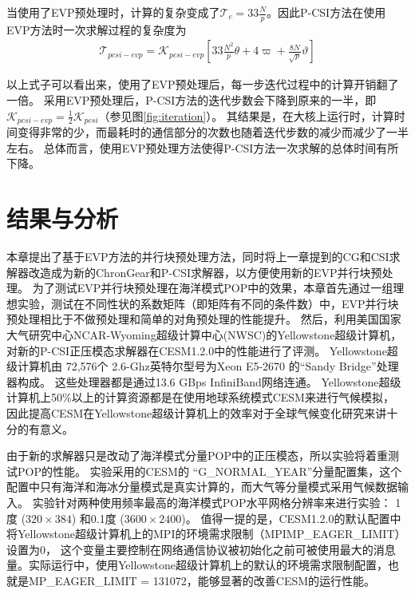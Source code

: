 当使用了EVP预处理时，计算的复杂变成了$\mathcal{T}_c = 33\frac{N}{p}$。因此P-CSI方法在使用EVP方法时一次求解过程的复杂度为
\begin{eqnarray}
\label{t_pcsiEvp}
\mathcal{T}_{pcsi-evp}=\mathcal{K}_{pcsi-evp}[33\frac{N^2}{p}\theta+ 4\varpi + \frac{8N}{ \sqrt{p}}\vartheta]
\end{eqnarray}

以上式子可以看出来，使用了EVP预处理后，每一步迭代过程中的计算开销翻了一倍。
采用EVP预处理后，P-CSI方法的迭代步数会下降到原来的一半，即$\mathcal{K}_{pcsi-evp} = \frac{1}{2}\mathcal{K}_{pcsi}$（参见图\ref{fig:iteration}）。
其结果是，在大核上运行时，计算时间变得非常的少，而最耗时的通信部分的次数也随着迭代步数的减少而减少了一半左右。
总体而言，使用EVP预处理方法使得P-CSI方法一次求解的总体时间有所下降。 


\section{结果与分析}
\label{precond:exp}


本章提出了基于EVP方法的并行块预处理方法，同时将上一章提到的CG和CSI求解器改造成为新的ChronGear和P-CSI求解器，以方便使用新的EVP并行块预处理。
为了测试EVP并行块预处理在海洋模式POP中的效果，本章首先通过一组理想实验，测试在不同性状的系数矩阵（即矩阵有不同的条件数）中，EVP并行块预处理相比于不做预处理和简单的对角预处理的性能提升。
然后，利用美国国家大气研究中心NCAR-Wyoming超级计算中心(NWSC)\cite{loft:2015}的Yellowstone超级计算机，对新的P-CSI正压模态求解器在CESM1.2.0中的性能进行了评测。 
Yellowstone超级计算机由 72,576个
2.6-Ghz英特尔型号为Xeon E5-2670 的“Sandy Bridge”处理器构成。 
这些处理器都是通过13.6 GBps InfiniBand网络连通。   
Yellowstone超级计算机上50\%以上的计算资源都是在使用地球系统模式CESM来进行气候模拟， 
因此提高CESM在Yellowstone超级计算机上的效率对于全球气候变化研究来讲十分的有意义\cite{wf2014}。 


由于新的求解器只是改动了海洋模式分量POP中的正压模态，所以实验将着重测试POP的性能。 
实验采用的CESM的
“G\_NORMAL\_YEAR”分量配置集，这个配置中只有海洋和海冰分量模式是真实计算的，而大气等分量模式采用气候数据输入。
实验针对两种使用频率最高的海洋模式POP水平网格分辨率来进行实验：
1度 ($320\times 384$) 和0.1度 ($3600\times 2400$)。
值得一提的是，CESM1.2.0的默认配置中将Yellowstone超级计算机上的MPI的环境需求限制（MPIMP\_EAGER\_LIMIT）设置为0， 这个变量主要控制在网络通信协议被初始化之前可被使用最大的消息量。实际运行中，使用Yellowstone超级计算机上的默认的环境需求限制配置，也就是MP\_EAGER\_LIMIT = 131072，能够显著的改善CESM的运行性能。 

